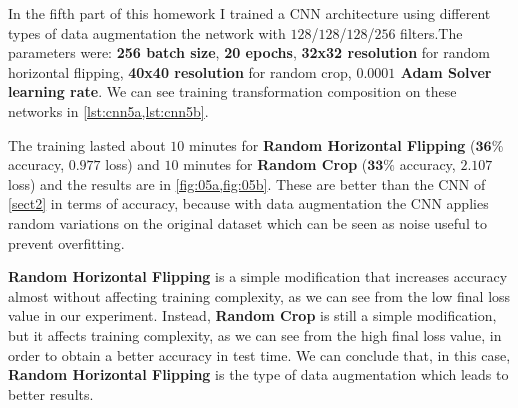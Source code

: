 \documentclass[a4paper, 11pt]{article}
\begin{document}
	In the fifth part of this homework I trained a CNN architecture using different types of data augmentation the network with $128$/$128$/$128$/$256$ filters.The parameters were: \textbf{256 batch size}, \textbf{20 epochs}, \textbf{32x32 resolution} for random horizontal flipping, \textbf{40x40 resolution} for random crop, \textbf{$\boldsymbol{0.0001}$ Adam Solver learning rate}. We can see training transformation composition on these networks in \vref{lst:cnn5a,lst:cnn5b}.
	
	
	
	
	The training lasted about $10$ minutes for \textbf{Random Horizontal Flipping} ($\boldsymbol{36\%}$ accuracy, $\boldsymbol{0.977}$ loss)  and $10$ minutes for \textbf{Random Crop} ($\boldsymbol{33\%}$ accuracy, $\boldsymbol{2.107}$ loss) and the results are in \vref{fig:05a,fig:05b}.
	These are better than the CNN of \cref{sect2} in terms of accuracy, because with data augmentation the CNN applies random variations on the original dataset which can be seen as noise useful to prevent overfitting.
	
	\textbf{Random Horizontal Flipping} is a simple modification that increases accuracy almost without affecting training complexity, as we can see from the low final loss value in our experiment. 
	Instead, \textbf{Random Crop} is still a simple modification, but it affects training complexity, as we can see from the high final loss value, in order to obtain a better accuracy in test time.  
	We can conclude that, in this case, \textbf{Random Horizontal Flipping} is the type of data augmentation which leads to better results.
	
\end{document}
